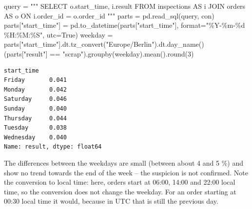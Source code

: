 \documentclass[
  letterpaper,
  DIV=11,
  numbers=noendperiod]{scrreprt}
\newenvironment{Shaded}{\begin{snugshade}}{\end{snugshade}}
\newcommand{\BuiltInTok}[1]{\textcolor[rgb]{0.00,0.23,0.31}{#1}}
\newcommand{\DecValTok}[1]{\textcolor[rgb]{0.68,0.00,0.00}{#1}}
\newcommand{\NormalTok}[1]{\textcolor[rgb]{0.00,0.23,0.31}{#1}}
\newcommand{\OperatorTok}[1]{\textcolor[rgb]{0.37,0.37,0.37}{#1}}
\newcommand{\SpecialCharTok}[1]{\textcolor[rgb]{0.37,0.37,0.37}{#1}}
\newcommand{\StringTok}[1]{\textcolor[rgb]{0.13,0.47,0.30}{#1}}
\newcommand{\VariableTok}[1]{\textcolor[rgb]{0.07,0.07,0.07}{#1}}
\begin{document}
\begin{tcolorbox}[enhanced jigsaw, left=2mm, title=\textcolor{quarto-callout-caution-color}{\faFire}\hspace{0.5em}{Solution to Exercise 2}, opacityback=0, breakable, rightrule=.15mm, arc=.35mm, toptitle=1mm, colbacktitle=quarto-callout-caution-color!10!white, opacitybacktitle=0.6, coltitle=black, colframe=quarto-callout-caution-color-frame, bottomrule=.15mm, leftrule=.75mm, bottomtitle=1mm, titlerule=0mm, toprule=.15mm, colback=white]

\begin{Shaded}
\begin{Highlighting}[]
\NormalTok{query }\OperatorTok{=} \StringTok{"""}
\StringTok{SELECT o.start\_time, i.result}
\StringTok{FROM inspections AS i}
\StringTok{JOIN orders AS o ON i.order\_id = o.order\_id}
\StringTok{"""}
\NormalTok{parts }\OperatorTok{=}\NormalTok{ pd.read\_sql(query, con)}
\NormalTok{parts[}\StringTok{"start\_time"}\NormalTok{] }\OperatorTok{=}\NormalTok{ pd.to\_datetime(parts[}\StringTok{"start\_time"}\NormalTok{], }\BuiltInTok{format}\OperatorTok{=}\StringTok{"\%Y{-}\%m{-}}\SpecialCharTok{\%d}\StringTok{ \%H:\%M:\%S"}\NormalTok{, utc}\OperatorTok{=}\VariableTok{True}\NormalTok{)}
\NormalTok{weekday }\OperatorTok{=}\NormalTok{ parts[}\StringTok{"start\_time"}\NormalTok{].dt.tz\_convert(}\StringTok{"Europe/Berlin"}\NormalTok{).dt.day\_name()}
\NormalTok{(parts[}\StringTok{"result"}\NormalTok{] }\OperatorTok{==} \StringTok{"scrap"}\NormalTok{).groupby(weekday).mean().}\BuiltInTok{round}\NormalTok{(}\DecValTok{3}\NormalTok{)}
\end{Highlighting}
\end{Shaded}

\begin{verbatim}
start_time
Friday       0.041
Monday       0.042
Saturday     0.046
Sunday       0.040
Thursday     0.044
Tuesday      0.038
Wednesday    0.040
Name: result, dtype: float64
\end{verbatim}

The differences between the weekdays are small (between about 4 and 5
\%) and show no trend towards the end of the week -- the suspicion is
not confirmed. Note the conversion to local time: here, orders start at
06:00, 14:00 and 22:00 local time, so the conversion does not change the
weekday. For an order starting at 00:30 local time it would, because in
UTC that is still the previous day.

\end{tcolorbox}
\end{document}

